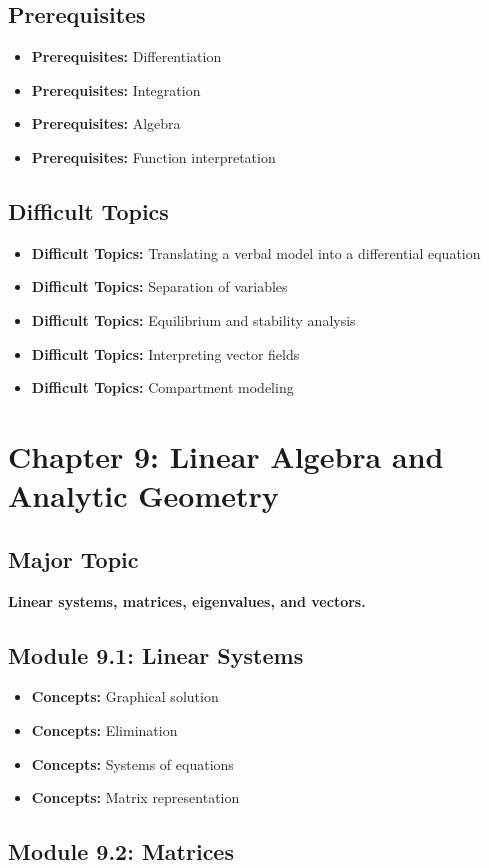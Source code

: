 \documentclass[11pt]{article}
\newcommand{\concept}[1]{\item \textbf{Concepts:} #1}
\newcommand{\difficult}[1]{\item \textbf{Difficult Topics:} #1}
\newcommand{\prereq}[1]{\item \textbf{Prerequisites:} #1}
\begin{document}
\subsection{Prerequisites}

\begin{itemize}
    \prereq{Differentiation}
    \prereq{Integration}
    \prereq{Algebra}
    \prereq{Function interpretation}
\end{itemize}

\subsection{Difficult Topics}

\begin{itemize}
    \difficult{Translating a verbal model into a differential equation}
    \difficult{Separation of variables}
    \difficult{Equilibrium and stability analysis}
    \difficult{Interpreting vector fields}
    \difficult{Compartment modeling}
\end{itemize}


\section{Chapter 9: Linear Algebra and Analytic Geometry}

\subsection{Major Topic}

\textbf{Linear systems, matrices, eigenvalues, and vectors.}

\subsection{Module 9.1: Linear Systems}

\begin{itemize}
    \concept{Graphical solution}
    \concept{Elimination}
    \concept{Systems of equations}
    \concept{Matrix representation}
\end{itemize}

\subsection{Module 9.2: Matrices}
\end{document}
